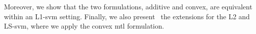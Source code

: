 Moreover, we show that the two formulations, {additive} and {convex}, are equivalent within an L1-\acrshort{svm} setting.
%
Finally, we also present~\citet{RuizAD21} the extensions for the L2 and LS-\acrshort{svm}, where we apply the convex \acrshort{mtl} formulation.


